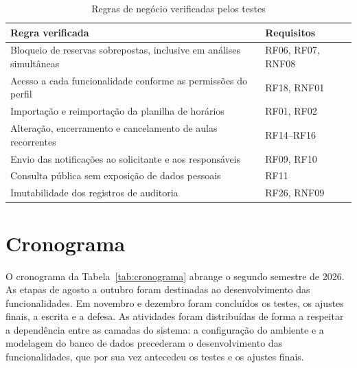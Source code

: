 \documentclass[
	12pt,				%
	twoside,			%
	openany,			%
	a4paper,			%
	chapter=TITLE,		%
	section=TITLE,		%
	subsection=TITLE,	%
	subsubsection=TITLE,%
	english,			%
	french,				%
	spanish,			%
	brazil,				%
	]{abntex2}
\begin{document}
\begin{table}[!htb]
	\centering
	\caption{Regras de negócio verificadas pelos testes}
	\begin{tabular}{@{}>{\raggedright\arraybackslash}p{9.8cm}>{\raggedright\arraybackslash}p{4.0cm}@{}}
	\hline
		\textbf{Regra verificada} & \textbf{Requisitos} \\ \hline
		Bloqueio de reservas sobrepostas, inclusive em análises simultâneas & RF06, RF07, RNF08 \\
		Acesso a cada funcionalidade conforme as permissões do perfil & RF18, RNF01 \\
		Importação e reimportação da planilha de horários & RF01, RF02 \\
		Alteração, encerramento e cancelamento de aulas recorrentes & RF14--RF16 \\
		Envio das notificações ao solicitante e aos responsáveis & RF09, RF10 \\
		Consulta pública sem exposição de dados pessoais & RF11 \\
		Imutabilidade dos registros de auditoria & RF26, RNF09 \\ \hline
	\end{tabular}
	\label{tab:testes}
\end{table}

\section{Cronograma}
\label{sec:cronograma}

O cronograma da Tabela~\ref{tab:cronograma} abrange o segundo semestre de 2026. As etapas de agosto a outubro foram destinadas ao desenvolvimento das funcionalidades. Em novembro e dezembro foram concluídos os testes, os ajustes finais, a escrita e a defesa. As atividades foram distribuídas de forma a respeitar a dependência entre as camadas do sistema: a configuração do ambiente e a modelagem do banco de dados precederam o desenvolvimento das funcionalidades, que por sua vez antecedeu os testes e os ajustes finais.
\end{document}
